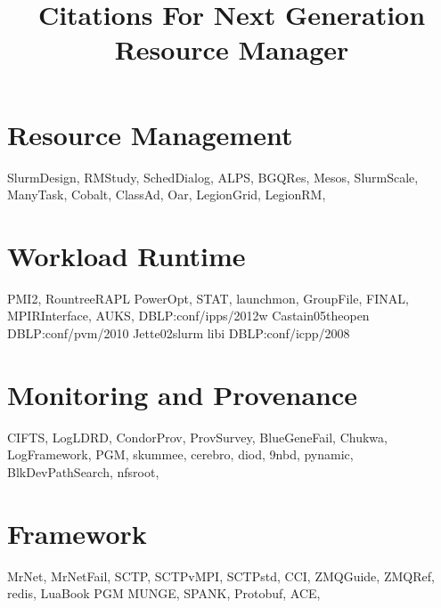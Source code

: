 \documentclass{article}
\newcommand{\ngrmfull}{Next Generation Resource Manager}
\begin{document}
\title{Citations For \ngrmfull}
\maketitle

\section{Resource Management}

SlurmDesign\cite{SlurmDesign},
RMStudy\cite{RMStudy},
SchedDialog\cite{SchedDialog},
ALPS\cite{ALPS},
BGQRes\cite{BGQRes},
Mesos\cite{Mesos},
SlurmScale\cite{SlurmScale},
ManyTask\cite{ManyTask},
Cobalt\cite{Cobalt},
ClassAd\cite{ClassAd},
Oar\cite{Oar},
LegionGrid\cite{LegionGrid},
LegionRM\cite{LegionRM},

\section{Workload Runtime}

PMI2\cite{PMI2},
RountreeRAPL\cite{RountreeRAPL}
PowerOpt\cite{PowerOpt},
STAT\cite{STAT},
launchmon\cite{launchmon},
GroupFile\cite{GroupFile},
FINAL\cite{FINAL},
MPIRInterface\cite{MPIRInterface},
AUKS\cite{AUKS},
DBLP:conf/ipps/2012w\cite{DBLP:conf/ipps/2012w}
Castain05theopen\cite{Castain05theopen}
DBLP:conf/pvm/2010\cite{DBLP:conf/pvm/2010}
Jette02slurm\cite{Jette02slurm}
libi\cite{libi}
DBLP:conf/icpp/2008\cite{DBLP:conf/icpp/2008}

\section{Monitoring and Provenance}

CIFTS\cite{CIFTS},
LogLDRD\cite{LogLDRD},
CondorProv\cite{CondorProv},
ProvSurvey\cite{ProvSurvey},
BlueGeneFail\cite{BlueGeneFail},
Chukwa\cite{Chukwa},
LogFramework\cite{LogFramework},
PGM\cite{rfc3208},
skummee\cite{skummee},
cerebro\cite{cerebro},
diod\cite{diod},
9nbd\cite{9nbd},
pynamic\cite{pynamic},
BlkDevPathSearch\cite{BlkDevPathSearch},
nfsroot\cite{nfsroot},

\section{Framework}

MrNet\cite{MrNet},
MrNetFail\cite{MrNetFail},
SCTP\cite{SCTP},
SCTPvMPI\cite{SCTPvMPI},
SCTPstd\cite{SCTPstd},
CCI\cite{CCI},
ZMQGuide\cite{ZMQGuide},
ZMQRef\cite{ZMQRef},
redis\cite{redis},
LuaBook\cite{LuaBook}
PGM\cite{rfc3208}
MUNGE\cite{munge},
SPANK\cite{SPANK},
Protobuf\cite{Protobuf},
ACE\cite{ACE},



\end{document}
